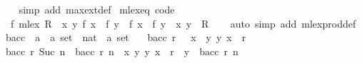 \begin{isabellebody}
%
\isadelimproof
\ \ %
\endisadelimproof
%
\isatagproof
{}\isamarkupfalse%
\ {\isacharparenleft}{\kern0pt}simp\ add{\isacharcolon}{\kern0pt}\ max{\isacharunderscore}{\kern0pt}ext{\isacharunderscore}{\kern0pt}def{\isacharparenright}{\kern0pt}%
\endisatagproof
{\isafoldproof}%
%
\isadelimproof
\isanewline
%
\endisadelimproof
\isanewline
{}\isamarkupfalse%
\ mlex{\isacharunderscore}{\kern0pt}eq\ {\isacharbrackleft}{\kern0pt}code{\isacharbrackright}{\kern0pt}{\isacharcolon}{\kern0pt}\isanewline
\ \ {\isachardoublequoteopen}f\ {\isacharless}{\kern0pt}{\isacharasterisk}{\kern0pt}mlex{\isacharasterisk}{\kern0pt}{\isachargreater}{\kern0pt}\ R\ {\isacharequal}{\kern0pt}\ {\isacharbraceleft}{\kern0pt}{\isacharparenleft}{\kern0pt}x{\isacharcomma}{\kern0pt}\ y{\isacharparenright}{\kern0pt}{\isachardot}{\kern0pt}\ f\ x\ {\isacharless}{\kern0pt}\ f\ y\ {\isasymor}\ {\isacharparenleft}{\kern0pt}f\ x\ {\isasymle}\ f\ y\ {\isasymand}\ {\isacharparenleft}{\kern0pt}x{\isacharcomma}{\kern0pt}\ y{\isacharparenright}{\kern0pt}\ {\isasymin}\ R{\isacharparenright}{\kern0pt}{\isacharbraceright}{\kern0pt}{\isachardoublequoteclose}\isanewline
%
\isadelimproof
\ \ %
\endisadelimproof
%
\isatagproof
{}\isamarkupfalse%
\ {\isacharparenleft}{\kern0pt}auto\ simp\ add{\isacharcolon}{\kern0pt}\ mlex{\isacharunderscore}{\kern0pt}prod{\isacharunderscore}{\kern0pt}def{\isacharparenright}{\kern0pt}%
\endisatagproof
{\isafoldproof}%
%
\isadelimproof
%
\endisadelimproof
%
\isadelimdocument
%
\endisadelimdocument
%
\isatagdocument
%
\isamarkuptrue%
%
\endisatagdocument
{\isafolddocument}%
%
\isadelimdocument
%
\endisadelimdocument
{}\isamarkupfalse%
\ bacc\ {\isacharcolon}{\kern0pt}{\isacharcolon}{\kern0pt}\ {\isachardoublequoteopen}{\isacharparenleft}{\kern0pt}{\isacharprime}{\kern0pt}a\ {\isasymtimes}\ {\isacharprime}{\kern0pt}a{\isacharparenright}{\kern0pt}\ set\ {\isasymRightarrow}\ nat\ {\isasymRightarrow}\ {\isacharprime}{\kern0pt}a\ set{\isachardoublequoteclose}\ \isanewline
{}\isanewline
\ \ {\isachardoublequoteopen}bacc\ r\ {}\ {\isacharequal}{\kern0pt}\ {\isacharbraceleft}{\kern0pt}x{\isachardot}{\kern0pt}\ {\isasymforall}\ y{\isachardot}{\kern0pt}\ {\isacharparenleft}{\kern0pt}y{\isacharcomma}{\kern0pt}\ x{\isacharparenright}{\kern0pt}\ {\isasymnotin}\ r{\isacharbraceright}{\kern0pt}{\isachardoublequoteclose}\isanewline
{\isacharbar}{\kern0pt}\ {\isachardoublequoteopen}bacc\ r\ {\isacharparenleft}{\kern0pt}Suc\ n{\isacharparenright}{\kern0pt}\ {\isacharequal}{\kern0pt}\ {\isacharparenleft}{\kern0pt}bacc\ r\ n\ {\isasymunion}\ {\isacharbraceleft}{\kern0pt}x{\isachardot}{\kern0pt}\ {\isasymforall}y{\isachardot}{\kern0pt}\ {\isacharparenleft}{\kern0pt}y{\isacharcomma}{\kern0pt}\ x{\isacharparenright}{\kern0pt}\ {\isasymin}\ r\ {\isasymlongrightarrow}\ y\ {\isasymin}\ bacc\ r\ n{\isacharbraceright}{\kern0pt}{\isacharparenright}{\kern0pt}{\isachardoublequoteclose}\isanewline

\end{isabellebody}
